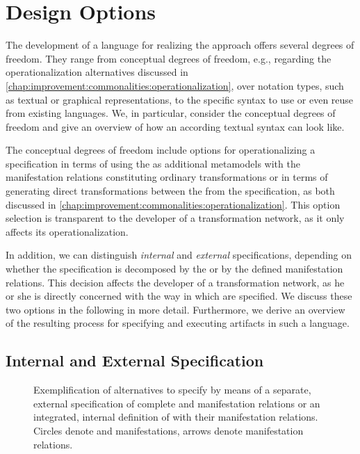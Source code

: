 \section{Design Options}

The development of a language for realizing the \commonalities approach offers several degrees of freedom.
They range from conceptual degrees of freedom, e.g., regarding the operationalization alternatives discussed in \autoref{chap:improvement:commonalities:operationalization}, over notation types, such as textual or graphical representations, to the specific syntax to use or even reuse from existing languages.
We, in particular, consider the conceptual degrees of freedom and give an overview of how an according textual syntax can look like.

The conceptual degrees of freedom include options for operationalizing a specification in terms of using the \conceptmetamodels as additional metamodels with the manifestation relations constituting ordinary transformations or in terms of generating direct transformations between the \concretemetamodels from the \commonalities specification, as both discussed in \autoref{chap:improvement:commonalities:operationalization}.
This option selection is transparent to the developer of a transformation network, as it only affects its operationalization.

In addition, we can distinguish \emph{internal} and \emph{external} specifications, depending on whether the specification is decomposed by the \commonalities or by the defined manifestation relations.
This decision affects the developer of a transformation network, as he or she is directly concerned with the way in which \commonalities are specified.
We discuss these two options in the following in more detail.
Furthermore, we derive an overview of the resulting process for specifying and executing artifacts in such a language.


\subsection{Internal and External Specification}
\label{chap:language:design:internal_external}

\begin{figure}
    \centering
    
    \caption[Design options for \commonalities specification]{Exemplification of alternatives to specify \commonalities by means of a separate, external specification of complete \conceptmetamodels and manifestation relations or an integrated, internal definition of \commonalities with their manifestation relations. Circles denote \commonalities and manifestations, arrows denote manifestation relations.}
    \label{fig:language:design_options}
\end{figure}

